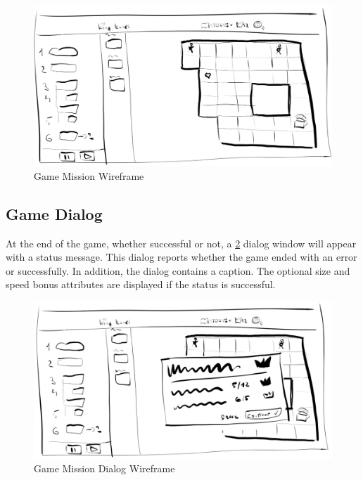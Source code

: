 \begin{figure}
    \centering
    \includegraphics[width=1\linewidth]{assets/design/ui/wir_game_mission.png}
    \caption{Game Mission Wireframe}
    \label{fig:design:wir:game-mission}
\end{figure}

\subsection{Game Dialog}

At the end of the game, whether successful or not, a \ref{fig:design:wir:game-dialog} dialog window will appear with a status message.
This dialog reports whether the game ended with an error or successfully.
In addition, the dialog contains a caption.
The optional size and speed bonus attributes are displayed if the status is successful.

\begin{figure}
    \centering
    \includegraphics[width=1\linewidth]{assets/design/ui/wir_game_dialog.png}
    \caption{Game Mission Dialog Wireframe}
    \label{fig:design:wir:game-dialog}
\end{figure}

